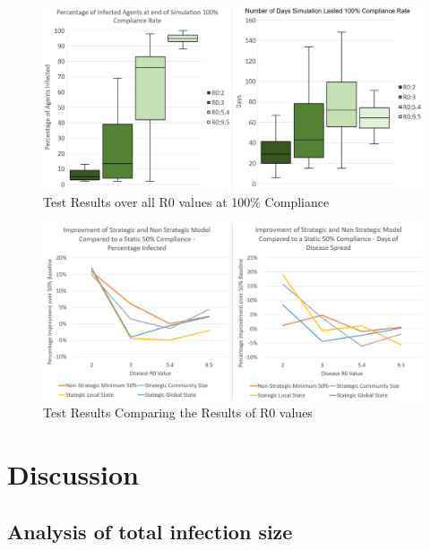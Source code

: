 \documentclass{article}
\begin{document}
\begin{figure}[h!]
\centering
\includegraphics[width=\textwidth]{6}
\caption{Test Results over all R0 values at 100\% Compliance}
\end{figure}

\begin{figure}[h!]
\centering
\includegraphics[width=\textwidth]{1}
\caption{Test Results Comparing the Results of R0 values}
\end{figure}
\newpage


\section{Discussion}

\subsection{Analysis of total infection size}
\end{document}
